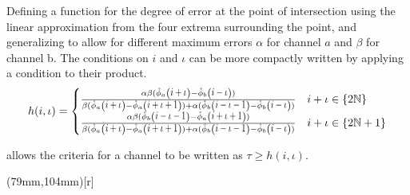 Defining a function for the degree of error at the point of intersection using the linear approximation from the four extrema surrounding the point, and generalizing to allow for different maximum errors $\alpha$ for channel $a$ and $\beta$ for channel b. The conditions on $i$ and $\iota$ can be more compactly written by applying a condition to their product.
\begin{equation}\label{eq:generalizedPerturbation}
h(i,\iota)  = \begin{cases}
\frac{\alpha  \beta  (\extremaTheta{a} {i+\iota }-\extremaTheta{b} {i-\iota })}
{\beta  (\extremaTheta{a} {i+\iota } - \extremaTheta{a} {i+\iota +1} ) + \alpha  (\extremaTheta{b} {i-\iota -1} - \extremaTheta{b} {i-\iota } ) }  &
  i + \iota \in \{2 \mathbb{N}     \}  \\
\frac{\alpha  \beta  (\extremaTheta{b} {i-\iota -1}-\extremaTheta{a} {i+\iota +1})}
{\beta  ( \extremaTheta{a} { i+\iota } -\extremaTheta{a} { i+\iota + 1 } ) +\alpha  ( \extremaTheta{b} {i-\iota -1} -\extremaTheta{b} {i-\iota } ) }  & 
i + \iota \in \{2 \mathbb{N}  + 1 \} 
\end{cases}
\end{equation}

allows the criteria for a channel to be written as $\tau \ge h(i,\iota)$. 

\parpic(79mm,104mm)[r]{
}

